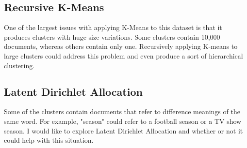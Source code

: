 \documentclass{article} %
\begin{document}
\subsection{Recursive K-Means}

One of the largest issues with applying K-Means to this dataset is that it produces clusters with huge size variations. Some clusters contain 10,000 documents, whereas others contain only one. Recursively applying K-means to large clusters could address this problem and even produce a sort of hierarchical clustering.

\subsection{Latent Dirichlet Allocation}

Some of the clusters contain documents that refer to difference meanings of the same word. For example, "season" could refer to a football season or a TV show season. I would like to explore Latent Dirichlet Allocation and whether or not it could help with this situation.
\end{document}
